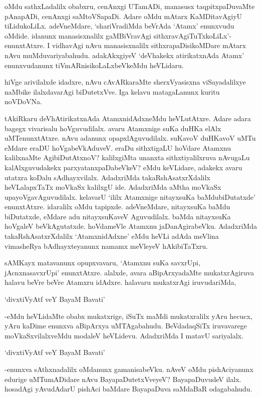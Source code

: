 oMdu sathxLadalilx obabxru, cenAnxgi UTamADi, manasusx taqpitxpaDuvaMte pAnapADi, cenAnxgi saMtoVSapaDi. Adare oMdu mAtarx KaMDitavAgiyU tiLidukoLiLx. adeVneMdare, `shariVradiMda beVrAda `Atamx' enunxvudu oMdide. idanunx manasisxnalilx gaMBiVravAgi sithxravAgiTuTxkoLiLx'-enunxtAtxre. I vidhavAgi nAvu manasisxnalilx sithxrapaDisikoMDare mAtarx nAvu muMduvariyabahudu. adakAkxgiyeV `deVhakekx atirikatxnAda Atamx' enunxvudanunx tiVmARnisikoLaLxbeVkeMdu heVLidaru.

hiVge arivilalxde idadxre, nAvu cAvARkaraMte sherxVyasisxna viSayadalilxye naMbike ilalxdavarAgi biDutetxVve. Iga kelavu matagaLanunx kuritu noVDoVNa.

tAkiRkaru deVhAtirikatxnAda AtamxnidAdxneMdu heVLutAtxre. Adare adara bagegx vivarisalu hoVguvudilalx. avaru Atamxnige suKa duHKa elAlx uMTenunxtAtxre. nAvu adanunx opapxlAguvudilalx. suKavoV duHKavoV uMTu eMdare eraDU hoVgabeVkAduveV. eraDu sithxtigaLU hoVdare Atamxnu kalilxnaMte AgibiDutAtxnoV? kalilxgiMta unanxta sithxtiyalilxruva nAvugaLu kalAlxguvudakekx parxyatanxpaDabeVkeV? eMdu keVLidare, adakekx avaru utatxra koDalu sAdhayxvilalx. AdadxriMda takaRshAsatxrXdalilx heVLalapxTaTx moVkaSx kalilxgU ide. AdadxriMda aMtha moVkaSx upayoVgavAguvudilalx. kelavarU `ililx Atamxnige nitayxsuKa baMdubiDutatxde' enunxtAtxre. idaralilx oMdu tapipxde. adeVneMdare, nitayxsuKa baMdu biDutatxde, eMdare adu nitayxsuKaveV Aguvudilalx. baMda nitayxsuKa hoVgaleV beVkAgutatxde. hoVdameVle Atamxnu jaDanAgirabeVku. AdadxriMda takaRshAsatxrXdalilx `AtamxnidAdxne' eMdu heVLi adAda meVlina vimasheRya bAdhayxteyanunx namamx meVleyeV hAkibiTaTxru. 

sAMKayx matavanunx opupxvavaru, `Atamxnu suKa savxrUpi, jAcnxnasavxrUpi' enunxtAtxre. alalxde, avara aBipArxyadaMte mukatxrAgiruva halavu beVre beVre Atamxru idAdxre. halavaru mukatxrAgi iruvudariMda,

\begin{shloka}
`divxtiVyAtf veY BayaM Bavati'
\end{shloka}

-eMdu heVLidaMte obabx mukatxrige, iSuTx maMdi mukatxralilx yAru hecucx, yAru kaDime enunxva aBipArxya uMTAgabahudu. BeVdadaqSiTx iruvavarege moVkaSxvilalxveMdu modaleV heVLidevu. AdadxriMda I matavU sariyalalx.

\begin{shloka}
`divxtiVyAtf veY BayaM Bavati'
\end{shloka}

-enunxva sAthxnadalilx oMdanunx gamanisabeVku. nAveV oMdu pishAciyanunx edurige uMTumADidare nAvu BayapaDutetxVveyeV? BayapaDuvudeV ilalx. hosadAgi yAvudAdarU pishAci baMdare BayapaDuva saMdaBaR odagabahudu.

